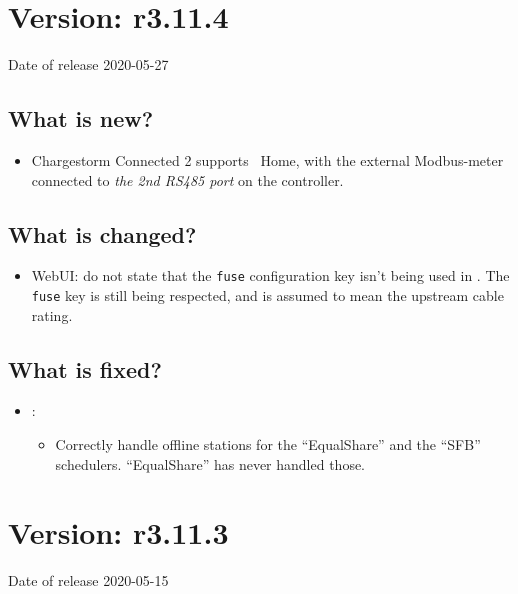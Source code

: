 \documentclass{scrartcl}
\begin{document}
\section{Version: r3.11.4}
Date of release 2020-05-27
\subsection*{What is new?}
\begin{itemize}
\item Chargestorm Connected 2 supports \nanogrid\ Home, with the external
  Modbus-meter connected to \emph{the 2nd RS485 port} on the controller.
\end{itemize}
\subsection*{What is changed?}
\begin{itemize}
\item WebUI: do not state that the \verb|fuse| configuration key isn't being
  used in \nanogrid. The \verb|fuse| key is still being respected, and is
  assumed to mean the upstream cable rating.
\end{itemize}
\subsection*{What is fixed?}
\begin{itemize}
\item \nanogrid:
  \begin{itemize}
  \item Correctly handle offline stations for the ``EqualShare'' and the
    ``SFB'' schedulers. ``EqualShare'' has never handled those.
  \end{itemize}
\end{itemize}

\section{Version: r3.11.3}
Date of release 2020-05-15
\end{document}

